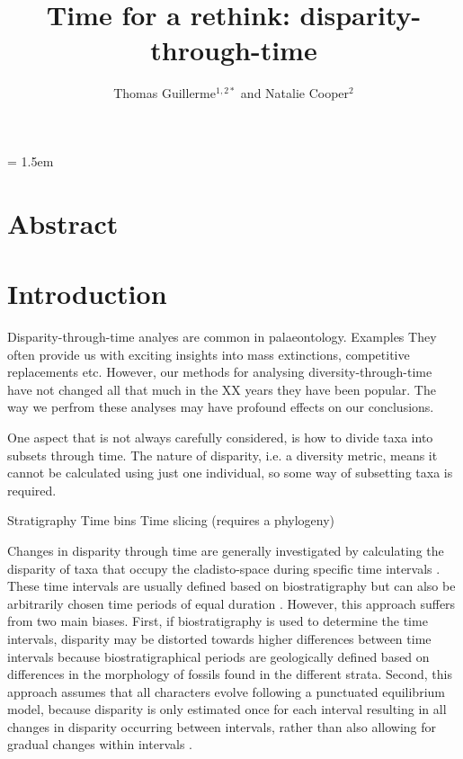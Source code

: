 \documentclass[12pt,a4paper]{article}
\title{Time for a rethink: disparity-through-time}
\author{
	Thomas Guillerme$^{1,2*}$ and Natalie Cooper$^{2}$
}
\date{}
\affiliation{\noindent{\footnotesize
	$^1$ Imperial\\ 
	$^2$Department of Life Sciences, Natural History Museum, Cromwell Road, London, SW7 5BD, UK. natalie.cooper@nhm.ac.uk}\\
	$^*$Corresponding author\\}
\begin{document}
\mstitlepage
\parindent = 1.5em
\addtolength{\parskip}{.3em}

\section{Abstract}
	

\newpage
\raggedright
\doublespacing
\setlength{\parindent}{1cm}

\section{Introduction}
Disparity-through-time analyes are common in palaeontology.
Examples
They often provide us with exciting insights into mass extinctions, competitive replacements etc.
However, our methods for analysing diversity-through-time have not changed all that much in the XX years they have been popular. 
The way we perfrom these analyses may have profound effects on our conclusions.

One aspect that is not always carefully considered, is how to divide taxa into subsets through time. The nature of disparity, i.e. a diversity metric, means it cannot be calculated using just one individual, so some way of subsetting taxa is required.

Stratigraphy
Time bins
Time slicing (requires a phylogeny)

Changes in disparity through time are generally investigated by calculating the disparity of taxa that occupy the cladisto-space during specific time intervals \citep[e.g][]{cisneros2010,prentice2011,Hughes20082013,hopkinsdecoupling2013,bentonmodels2014,bensonfaunal2014}.
These time intervals are usually defined based on biostratigraphy \citep[e.g.][]{cisneros2010,prentice2011,Hughes20082013,bentonmodels2014} but can also be arbitrarily chosen time periods of equal duration \citep{Butler2012,hopkinsdecoupling2013,bensonfaunal2014}.
However, this approach suffers from two main biases. 
First, if biostratigraphy is used to determine the time intervals, disparity may be distorted towards higher differences between time intervals because biostratigraphical periods are geologically defined based on differences in the morphology of fossils found in the different strata.
Second, this approach assumes that all characters evolve following a punctuated equilibrium model, because disparity is only estimated once for each interval resulting in all changes in disparity occurring between intervals, rather than also allowing for gradual changes within intervals \citep{Hunt21042015}.
\end{document}
